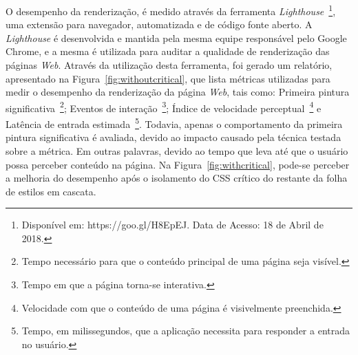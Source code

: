 O desempenho da renderização, é medido através da ferramenta \textit{Lighthouse}~\footnote{Disponível em: https://goo.gl/H8EpEJ. Data de Acesso: 18 de Abril de 2018.}, uma extensão para navegador, automatizada e de código fonte aberto. A \textit{Lighthouse} é desenvolvida e mantida pela mesma equipe responsável pelo Google Chrome, e a mesma é utilizada para auditar a qualidade de renderização das páginas \textit{Web}. Através da utilização desta ferramenta, foi gerado um relatório, apresentado na Figura~\ref{fig:withoutcritical}, que lista métricas utilizadas para medir o desempenho da renderização da página \textit{Web}, tais como: Primeira pintura significativa~\footnote{Tempo necessário para que o conteúdo principal de uma página seja visível.}; Eventos de interação~\footnote{Tempo em que a página torna-se interativa.}; Índice de velocidade perceptual~\footnote{Velocidade com que o conteúdo de uma página é visivelmente preenchida.} e Latência de entrada estimada~\footnote{Tempo, em milissegundos, que a aplicação necessita para responder a entrada no usuário.}. Todavia, apenas o comportamento da primeira pintura significativa é avaliada, devido ao impacto causado pela técnica testada sobre a métrica. Em outras palavras, devido ao tempo que leva até que o usuário possa perceber conteúdo na página. Na Figura~\ref{fig:withcritical}, pode-se perceber a melhoria do desempenho após o isolamento do CSS crítico do restante da folha de estilos em cascata.

\begin{figure}[th]
\end{figure}

